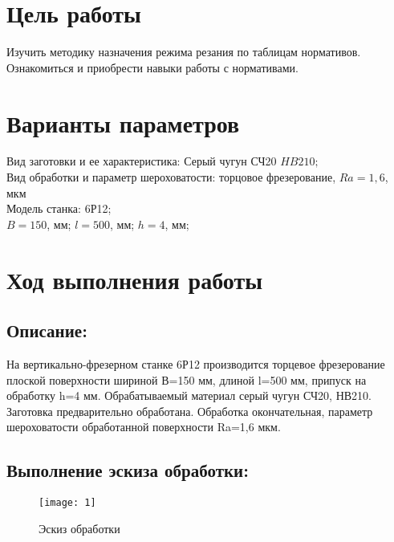 








\section{Цель работы}
Изучить методику назначения режима резания по таблицам нормативов. Ознакомиться и приобрести навыки работы с нормативами.

\section{Варианты параметров}			
Вид заготовки и ее характеристика: Серый чугун СЧ20 $HB210;$\\

Вид обработки и параметр шероховатости: торцовое фрезерование, $Ra=1,6$, мкм\\

Модель станка: 6Р12;\\

$B=150$, мм; $l=500$, мм; $h=4$, мм;\\					
\section{Ход выполнения работы}

\subsection{Описание:}
На вертикально-фрезерном станке 6Р12 производится торцевое фрезерование плоской поверхности шириной В=150 мм, длиной l=500 мм, припуск на обработку h=4 мм. Обрабатываемый материал серый чугун СЧ20, НВ210. Заготовка предварительно обработана. Обработка окончательная, параметр шероховатости обработанной поверхности Ra=1,6 мкм.

\subsection{Выполнение эскиза обработки:}
\begin{figure}[H]
	\begin{center}
		\texttt{[image: 1]}
		\caption{Эскиз обработки} 
		\label{pic:pic_1} %
	\end{center}
\end{figure}


